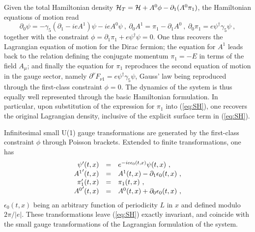 \documentclass[a4paper,11pt]{article}
\begin{document}
Given the total Hamiltonian density 
${\cal H}_T={\cal H}+A^0\phi-\partial_1(A^0\pi_1)$, 
the Hamiltonian equations of motion read
\begin{equation}
\partial_0\psi=-\gamma_5(\partial_1-ieA^1)\psi-ieA^0\psi\ ,\
\partial_0A^1=\pi_1-\partial_1A^0\ ,\
\partial_0\pi_1=e\psi^\dagger\gamma_5\psi\ ,
\end{equation}
together with the constraint $\phi=\partial_1\pi_1+e\psi^\dagger\psi=0$.
One thus recovers the Lagrangian equation of motion for the
Dirac fermion; the equation for $A^1$ leads back to the relation
defining the conjugate momentum $\pi_1=-E$ in terms of the field $A_\mu$;
and finally the equation for $\pi_1$ reproduces the second equation of
motion in the gauge sector, namely 
$\partial^\nu F_{\nu 1}=e\psi^\dagger\gamma_5\psi$, Gauss' law being 
reproduced through the first-class constraint $\phi=0$. The dynamics of the 
system is thus equally well represented through the basic Hamiltonian 
formulation. In particular, upon substitution of the expression for $\pi_1$ 
into (\ref{eq:SH}), one recovers the original Lagrangian density, inclusive
of the explicit surface term in (\ref{eq:SH}).

Infinitesimal small U(1) gauge transformations are generated by the first-class
constraint $\phi$ through Poisson brackets. Extended to finite 
transformations, one has
\begin{equation}
\begin{array}{r c l}
\psi'(t,x)&=&e^{-ie\epsilon_0(t,x)}\psi(t,x)\ ,\\
{A^1}'(t,x)&=&A^1(t,x)-\partial_1\epsilon_0(t,x)\ ,\\
\pi'_1(t,x)&=&\pi_1(t,x)\ ,\ \\
{A^0}'(t,x)&=&A^0(t,x)+\partial_0\epsilon_0(t,x)\ ,
\end{array}
\end{equation}
$\epsilon_0(t,x)$ being an arbitrary function of periodicity $L$ in $x$
and defined modulo $2\pi/|e|$.
These transformations leave (\ref{eq:SH}) exactly invariant, and coincide 
with the small gauge transformations of the Lagrangian formulation 
of the system.
\end{document}

